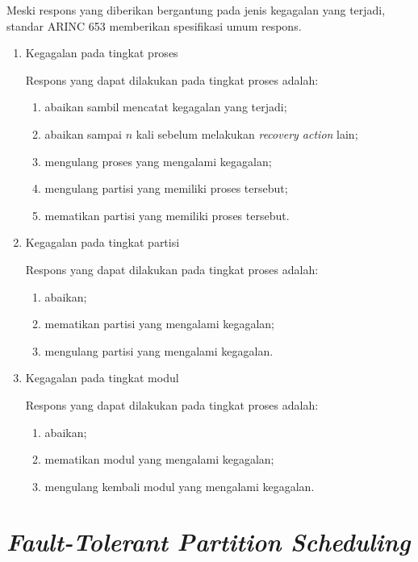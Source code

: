 Meski respons yang diberikan bergantung pada jenis kegagalan yang terjadi, standar ARINC 653
memberikan spesifikasi umum respons.
\begin{enumerate}

	\item Kegagalan pada tingkat proses

		Respons yang dapat dilakukan pada tingkat proses adalah:
		\begin{enumerate}
			\item abaikan sambil mencatat kegagalan yang terjadi;
			\item abaikan sampai $n$ kali sebelum melakukan \textit{recovery action}
				lain;
			\item mengulang proses yang mengalami kegagalan;
			\item mengulang partisi yang memiliki proses tersebut;
			\item mematikan partisi yang memiliki proses tersebut.
		\end{enumerate}

	\item Kegagalan pada tingkat partisi

		Respons yang dapat dilakukan pada tingkat proses adalah:
		\begin{enumerate}
			\item abaikan;
			\item mematikan partisi yang mengalami kegagalan;
			\item mengulang partisi yang mengalami kegagalan.
		\end{enumerate}

	\item Kegagalan pada tingkat modul

		Respons yang dapat dilakukan pada tingkat proses adalah:
		\begin{enumerate}
			\item abaikan;
			\item mematikan modul yang mengalami kegagalan;
			\item mengulang kembali modul yang mengalami kegagalan.
		\end{enumerate}

\end{enumerate}

\section{\textit{Fault-Tolerant Partition Scheduling}}

